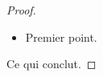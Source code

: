 \begin{proof}
  \begin{itemize}
    \item Premier point.
  \end{itemize}
  Ce qui conclut.
\end{proof}
